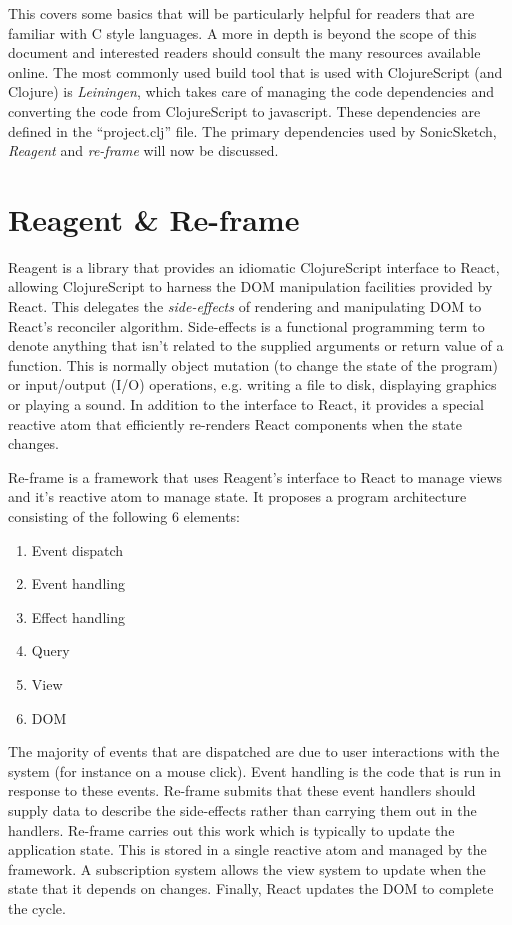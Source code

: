 \documentclass[12pt]{report}
\begin{document}
This covers some basics that will be particularly helpful for readers that are
familiar with C style languages. A more in depth is beyond the scope of this
document and interested readers should consult the many resources available
online. The most commonly used build tool that is used with ClojureScript (and
Clojure) is \emph{Leiningen}, which takes care of managing the code dependencies and
converting the code from ClojureScript to javascript. These dependencies are
defined in the ``project.clj'' file. The primary dependencies used by SonicSketch,
\emph{Reagent} and \emph{re-frame} will now be discussed.

\section{Reagent \& Re-frame}
\label{sec:orgd633c6c}
Reagent is a library that provides an idiomatic ClojureScript interface to
React, allowing ClojureScript to harness the DOM manipulation facilities
provided by React. This delegates the \emph{side-effects} of rendering and
manipulating DOM to React's reconciler algorithm. Side-effects is a functional
programming term to denote anything that isn't related to the supplied arguments
or return value of a function. This is normally object mutation (to change the
state of the program) or input/output (I/O) operations, e.g. writing a file to
disk, displaying graphics or playing a sound. \cite{sylwester_meaning_2015} In
addition to the interface to React, it provides a special reactive atom that
efficiently re-renders React components when the state changes.

Re-frame is a framework that uses Reagent's interface to React to manage views
and it's reactive atom to manage state. It proposes a program architecture
consisting of the following 6 elements:
\begin{enumerate}
\item Event dispatch
\item Event handling
\item Effect handling
\item Query
\item View
\item DOM
\end{enumerate}
The majority of events that are dispatched are due to user interactions with the
system (for instance on a mouse click). Event handling is the code that is run
in response to these events. Re-frame submits that these event handlers should
supply data to describe the side-effects rather than carrying them out in the
handlers. Re-frame carries out this work which is typically to update the
application state. This is stored in a single reactive atom and managed by the
framework. A subscription system allows the view system to update when the state
that it depends on changes. Finally, React updates the DOM to complete the
cycle.
\end{document}
